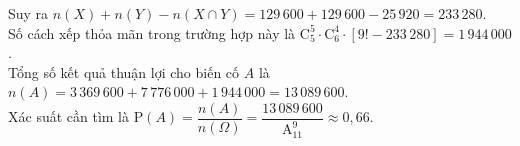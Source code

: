 \begin{ex}
{		Suy ra $n(X) + n(Y) - n(X \cap Y) = 129\,600 + 129\,600 - 25\,920 = 233\,280$.\\
		Số cách xếp thỏa mãn trong trường hợp này là $\mathrm{C}_5^5 \cdot \mathrm{C}_6^4 \cdot \left[ 9! - 233\,280 \right] = 1\,944\,000$.\\
		Tổng số kết quả thuận lợi cho biến cố $A$ là $n(A) = 3\,369\,600 + 7\,776\,000 + 1\,944\,000 = 13\,089\,600$.\\
		Xác suất cần tìm là $\mathrm{P}(A) = \dfrac{n(A)}{n(\Omega)} = \dfrac{13\,089\,600}{\mathrm{A}_{11}^9} \approx 0{,}66$.
	}
\end{ex}

\newpage
{}
\label{B\thedeso}